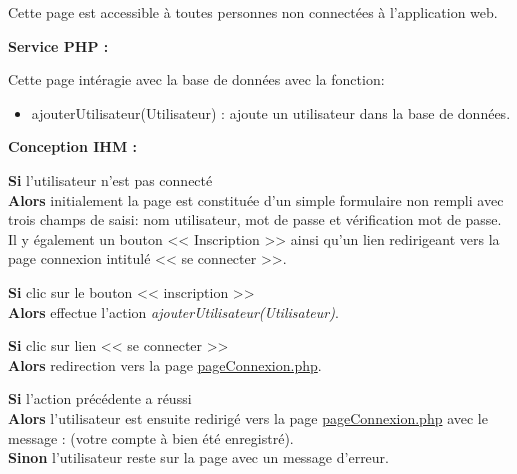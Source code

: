 			\begin{paragraphe}
				Cette page est accessible à toutes personnes non connectées à l'application web.
			\end{paragraphe}

			\begin{paragraphe}
				\textbf{Service PHP :}
			\end{paragraphe}

			\begin{paragraphe}
			    Cette page intéragie avec la base de données avec la fonction:
				\begin{itemize}
					\item ajouterUtilisateur(Utilisateur) : ajoute un utilisateur dans la base de données.
				\end{itemize}
			\end{paragraphe}

			\begin{paragraphe}
				\textbf{Conception IHM :}
			\end{paragraphe}

			\begin{paragraphe}
				\textbf{Si} l'utilisateur n'est pas connecté \\
				\textbf{Alors} initialement la page est constituée d'un simple formulaire non rempli avec trois champs de saisi: nom utilisateur, mot de passe et vérification mot de passe.
				Il y également un bouton << Inscription >> ainsi qu'un lien redirigeant vers la page connexion intitulé << se connecter >>.
			\end{paragraphe}

			\begin{paragraphe}
				\textbf{Si} clic sur le bouton << inscription >> \\
				\textbf{Alors} effectue l'action \emph{ajouterUtilisateur(Utilisateur)}.
			\end{paragraphe}

           \begin{paragraphe}
                \textbf{Si} clic sur lien << se connecter >> \\
                \textbf{Alors} redirection vers la page \underline{pageConnexion.php}.
            \end{paragraphe}

			\begin{paragraphe}
				\textbf{Si} l'action précédente a réussi \\
				\textbf{Alors} l'utilisateur est ensuite redirigé vers la page \underline{pageConnexion.php} avec le message : (votre compte à bien été enregistré). \\
				\textbf{Sinon} l'utilisateur reste sur la page avec un message d'erreur.
			\end{paragraphe}

